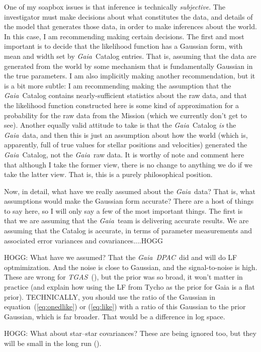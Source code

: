 \documentclass[12pt, modern]{aastex62}
\newcommand{\acronym}[1]{{\small{#1}}}
\newcommand{\Gaia}{\textsl{Gaia}}
\newcommand{\TGAS}{\textsl{\acronym{TGAS}}}
\newcommand{\DPAC}{\textsl{\acronym{DPAC}}}
\newcommand{\equationname}{equation}
\begin{document}
One of my soapbox issues is that inference is technically \emph{subjective}.
The investigator must make decisions about what constitutes the data,
and details of the model that generates those data, in order to make
inferences about the world.
In this case, I am recommending making certain decisions.
The first and most important is to decide that the likelihood function
has a Gaussian form, with mean and width set by \Gaia\ Catalog entries.
That is, assuming that the data are generated from the world by some mechanism
that is fundamentally Gaussian in the true parameters.
I am also implicitly making another recommendation, but it is a bit more
subtle:
I am recommending making the assumption that the \Gaia\ Catalog contains
nearly-sufficient statistics about the raw data, and that the likelihood function
constructed here is some kind of approximation for a probability for the raw data
from the Mission (which we currently don't get to see).
Another equally valid attitude to take is that the \Gaia\ Catalog
\emph{is}
the \Gaia\ data, and then this is just an assumption about how the world
(which is, apparently, full of true values for stellar positions and velocities)
generated the \Gaia\ Catalog, not the \Gaia\ raw data.
It is worthy of note and comment here that although I take the former view,
there is no change to anything we do if we take the latter view.
That is, this is a purely philosophical position.

Now, in detail, what have we really assumed about the \Gaia\ data?
That is, what assumptions would make the Gaussian form accurate?
There are a host of things to say here, so I will only say a few of the
most important things.
The first is that we are assuming that the \Gaia\ team is delivering
accurate results.
We are assuming that the Catalog is accurate, in terms of parameter
measurements and associated error variances and covariances....HOGG

HOGG: What have we assumed? That the \Gaia\ \DPAC\ did and will do LF optmimization.
And the
noise is close to Gaussian, and the signal-to-noise is high. These are wrong for
\TGAS\ (\citealt{michalik, dr1}), but the prior was so broad, it won't matter in practice (and explain how using the LF from Tycho as the prior for Gaia is a flat prior). TECHNICALLY, you should use
the ratio of the Gaussian in \equationname~(\ref{eq:onedlike}) or (\ref{eq:like}) with
a ratio of this Gaussian to the prior Gaussian, which is far broader. That would be
a difference in log space.

HOGG: What about star--star covariances? These are being ignored too, but they
will be small in the long run (\citealt{holl}).
\end{document}
